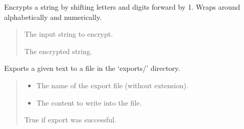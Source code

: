 \documentclass[letterpaper,10pt,english]{sphinxmanual}
\begin{document}

\begin{fulllineitems}
\label{\detokenize{modules:Database_Logic.encrypt}}
\pysigstartsignatures
{}
\pysigstopsignatures
\sphinxAtStartPar
Encrypts a string by shifting letters and digits forward by 1.
Wraps around alphabetically and numerically.
\begin{quote}\begin{description}
\sphinxAtStartPar
{} \textendash{} The input string to encrypt.

\sphinxAtStartPar
The encrypted string.

\end{description}\end{quote}

\end{fulllineitems}


\begin{fulllineitems}
\label{\detokenize{modules:Database_Logic.export}}
\pysigstartsignatures
{}
\pysigstopsignatures
\sphinxAtStartPar
Exports a given text to a file in the ‘exports/’ directory.
\begin{quote}\begin{description}
\begin{itemize}
\item {} 
\sphinxAtStartPar
{} \textendash{} The name of the export file (without extension).

\item {} 
\sphinxAtStartPar
{} \textendash{} The content to write into the file.

\end{itemize}

\sphinxAtStartPar
True if export was successful.

\end{description}\end{quote}

\end{fulllineitems}
\end{document}
